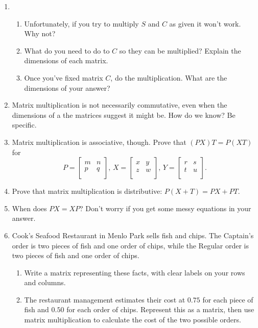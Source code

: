\documentclass[../gatm.tex]{subfiles}
\begin{document}
\begin{enumerate}
\setcounter{enumi}{\value{mtrx_mult_problem_i}}
\item \begin{enumerate}
\item Unfortunately, if you try to multiply $S$ and $C$ as given it won't work. Why not?
\item What do you need to do to $C$ so they can be multiplied? Explain the dimensions of each matrix.
\item Once you've fixed matrix $C$, do the multiplication. What are the dimensions of your answer?
\end{enumerate}
\item Matrix multiplication is not necessarily commutative, even when the dimensions of a the matrices suggest it might be. How do we know? Be specific.
\item Matrix multiplication is associative, though. Prove that $(PX)T=P(XT)$ for $$P=\left[\begin{array}{cc} m & n \\ p & q \\ \end{array}\right],\, X=\left[\begin{array}{cc} x & y \\ z & w \\ \end{array}\right],\, Y=\left[\begin{array}{cc} r & s \\ t & u \\ \end{array}\right].$$
\item Prove that matrix multiplication is distributive: $P(X+T)=PX+PT$.
\item When does $PX=XP$? Don't worry if you get some messy equations in your answer.
\item Cook's Seafood Restaurant in Menlo Park sells fish and chips. The Captain's order is two pieces of fish and one order of chips, while the Regular order is two pieces of fish and one order of chips.
\begin{enumerate}
\item Write a matrix representing these facts, with clear labels on your rows and columns.
\item The restaurant management estimates their cost at $0.75$ for each piece of fish and $0.50$ for each order of chips. Represent this as a matrix, then use matrix multiplication to calculate the cost of the two possible orders.

\end{enumerate}
\end{enumerate}
\end{document}
